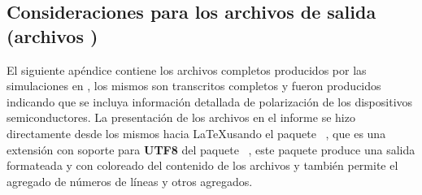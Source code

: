 \subsection{Consideraciones para los archivos de salida (archivos \textbf{)}}
\thispagestyle{codeconsstyle}
\renewcommand{\themark}{Consideraciones para los archivos de salida (archivos \textbf{\quotemarks{.out}})}

El siguiente apéndice contiene los archivos \textbf{} completos producidos por las simulaciones en \spice, los mismos son transcritos completos y fueron producidos indicando que se incluya información detallada de polarización de los dispositivos semiconductores. La presentación de los archivos en el informe se hizo directamente desde los mismos hacia \LaTeX\space usando el paquete \textbf{}~, que es una extensión con soporte para \textbf{UTF8} del paquete \textbf{}~, este paquete produce una salida formateada y con coloreado del contenido de los archivos y también permite el agregado de números de líneas y otros agregados. 
 

\clearpage

\lstset{language=,numbers=left,xleftmargin=1em,stepnumber=1}

\lstset{showspaces=false}
\lstset{showstringspaces=false}



\lstset{tabsize=4}

\lstset{numbersep=5pt}

\lstset{inputencoding=utf8/latin1}


